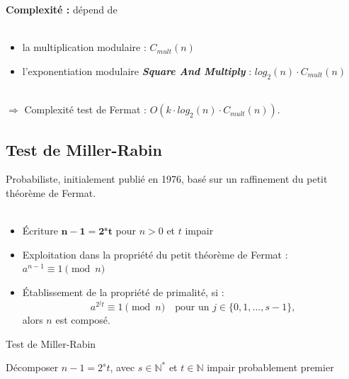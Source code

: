 			\begin{frame}
				\textbf{Complexité :} dépend de \\~\\
				\begin{itemize}
				\item la multiplication modulaire : $C_{mult}(n)$
				\item l'exponentiation modulaire \textbf{\textit{Square And Multiply}} : $log_{2}(n) \cdot C_{mult}(n)$
				\end{itemize}
				~\\
				$\Longrightarrow$ Complexité test de Fermat : $O(k \cdot log_{2}(n) \cdot C_{mult}(n))$.
			\end{frame}
		
		\subsection{Test de Miller-Rabin}
			\begin{frame}
			Probabiliste, initialement publié en 1976, basé sur un raffinement du petit théorème de Fermat.\\~\\
			\begin{itemize}
				\item Écriture $\mathbf{n - 1 = 2^{s}t}$ pour $n>0$ et $t$ impair
				\item Exploitation dans la propriété du petit théorème de Fermat : $a^{n-1}\equiv 1 \pmod n$
				\item Établissement de la propriété de primalité, si :
				\[ a^{2^{j}t} \equiv 1 \pmod n \quad \text{pour un } j \in \{0, 1, ..., s-1\} \text{,}\]
				alors $n$ est composé.
			\end{itemize}
			\end{frame}
			
			\begin{frame}
			
				\begin{algorithm}[H]
				\caption{Test de Miller-Rabin}\label{TMR}
				{Décomposer $n - 1 = 2^{s}t$, avec $s \in \mathbb{N}^{*}$ et $t \in \mathbb{N}$ impair \;}
				\Retour probablement premier\;
				\end{algorithm}
		
			\end{frame}
			
